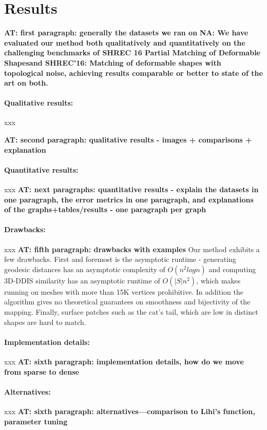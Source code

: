 \documentclass[10pt,twocolumn,letterpaper]{article}
\newcommand{\colornote}[3]{{\color{#1}\bf{#2: #3}\normalfont}}
\newcommand{\colornote}[3]{}
\newcommand {\ayellet}[1]{\colornote{blue}{AT}{#1}}
\newcommand {\nadav}[1]{\colornote{red}{NA}{#1}}
\begin{document}
\section{Results}
\label{section:results}

\ayellet{first paragraph: generally the datasets we ran on}
\nadav{We have evaluated our method both qualitatively and quantitatively on the challenging benchmarks of SHREC 16 Partial Matching of Deformable Shapes\cite{cosmo2016shrec}and SHREC’16: Matching of deformable shapes with topological noise\cite{lahner2016shrec}, achieving results comparable or better to state of the art on both.}
\paragraph{Qualitative results:} xxx

\ayellet{second paragraph: qualitative results - images + comparisons + explanation}

\paragraph{Quantitative results:} xxx
\ayellet{next paragraphs: quantitative results - explain the datasets in one paragraph, the error metrics in one paragraph, and explanations of the graphs+tables/results - one paragraph per graph}

\paragraph{Drawbacks:} xxx
\ayellet{fifth paragraph: drawbacks with examples}
Our method exhibits a few drawbacks. First and foremost is the asymptotic runtime - generating geodesic distances has an asymptotic complexity of $O(n^2 logn)$ and computing 3D-DDIS similarity has an asymptotic runtime of $O(|S|n^2)$, which makes running on meshes with more than 15K vertices prohibitive. In addition the algorithm gives no theoretical guarantees on smoothness and bijectivity of the mapping. Finally, surface patches such as the cat's tail, which are low in distinct shapes are hard to match.
\paragraph{Implementation details:} xxx
\ayellet{sixth paragraph: implementation details, how do we move from sparse to dense}

\paragraph{Alternatives:} xxx
\ayellet{sixth paragraph: alternatives---comparison to Lihi's function, parameter tuning}
\end{document}
